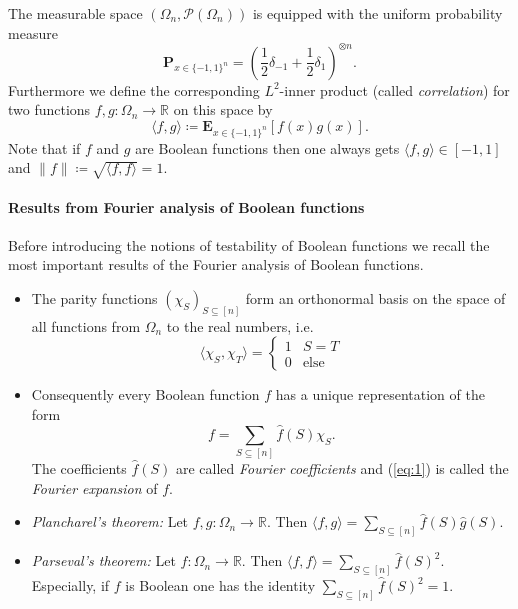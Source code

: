 \documentclass[a4paper]{article}
\newcommand{\prob}{\mathbf{P}}
\newcommand{\expe}{\mathbf{E}}
\newcommand{\real}{\mathbb{R}}
\newcommand{\nset}{[n]}
\theoremstyle{plain}
\theoremstyle{definition}
\begin{document}
\noindent The measurable space \(\left(\Omega_n, \mathcal{P}(\Omega_n)\right)\)
is equipped with the uniform probability measure \[\prob_{x \in
  \{-1,1\}^n} = \left(\frac{1}{2} \delta_{-1} +
  \frac{1}{2}\delta_1\right)^{\otimes n}.\]
Furthermore we define the corresponding \(L^2\)-inner product (called \emph{correlation}) for two
functions \(f,g: \Omega_n \rightarrow \real\) on this space by 
\[\langle f,g\rangle \coloneqq \expe_{x \in
  \{-1,1\}^n}\left[f(x)g(x)\right].\]
Note that if \(f\) and \(g\) are Boolean functions then one always
gets \(\langle f, g\rangle \in [-1,1]\) and \(\|f\| \coloneqq
\sqrt{\langle f, f\rangle } = 1\).  

\paragraph{Results from Fourier analysis of Boolean functions}
\label{sec:results-from-fourier}

Before introducing the notions of testability of Boolean functions we
recall the most important results of the Fourier analysis of Boolean
functions. 
\begin{itemize}
\item The parity functions \(\left(\chi_S\right)_{S \subseteq \nset}\)
  form an orthonormal basis on the space of all functions from
  \(\Omega_n\) to the real numbers, i.e. 
  \[\langle \chi_S, \chi_T\rangle =  \begin{cases}
    1 & S=T \\
    0 & \text{else}
  \end{cases}\]
\item Consequently every Boolean function \(f\) has a unique
  representation of the form 
  \begin{equation}
    \label{eq:1}
    f = \sum_{S\subseteq \nset} \hat{f}(S) \chi_S.
  \end{equation}
  The coefficients \(\hat{f}(S)\) are called \emph{Fourier
    coefficients} and (\ref{eq:1}) is called the \emph{Fourier
    expansion} of \(f\).
\item \emph{Plancharel's theorem:} Let \(f,g: \Omega_n \rightarrow
  \real\). Then \(\langle f, g\rangle = \sum_{S\subseteq \nset}
  \hat{f}(S)\hat{g}(S)\).
\item \emph{Parseval's theorem:} Let \(f: \Omega_n \rightarrow
  \real\). Then \(\langle f, f\rangle = \sum_{S\subseteq \nset}
  \hat{f}(S)^2\). Especially, if \(f\) is Boolean one has the identity \(\sum_{S\subseteq \nset}
  \hat{f}(S)^2 = 1\). 
\end{itemize}
\end{document}
